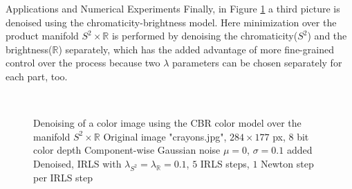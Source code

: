 \begin{chapter}{Applications and Numerical Experiments}
Finally, in Figure \ref{fig:application_color3} a third picture is denoised using the chromaticity-brightness model. Here minimization over the product manifold
$S^2\times \mathbb{R}$ is performed by denoising the chromaticity($S^2$) and the brightness($\mathbb{R}$) separately, which has the added advantage of more 
fine-grained control over the process because two $\lambda$ parameters can be chosen separately for each part, too.

\begin{figure}[h!]
    \centering
    \\
    \caption[Large image "crayons" CBR-vectorial denoising]{Denoising of a color image using the CBR color model over the manifold $S^2\times\mathbb{R}$
	 Original image "crayons.jpg", $284\times 177$ px, 8 bit color depth
	 Component-wise Gaussian noise $\mu=0$, $\sigma=0.1$ added
	 Denoised, IRLS with $\lambda_{S^2}=\lambda_{\mathbb{R}}=0.1$, $5$ IRLS steps, $1$ Newton step per IRLS step
	\label{fig:application_color3}
    }
\end{figure}


\end{chapter}
